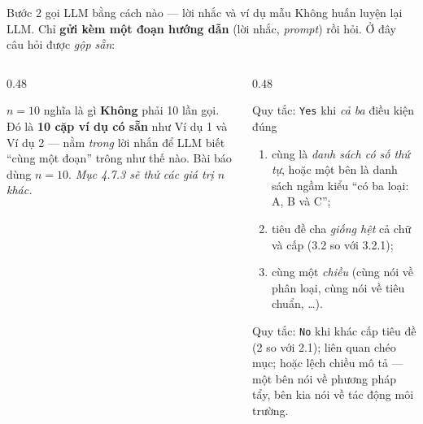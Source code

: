 \documentclass[aspectratio=169,10pt]{beamer}
\begin{document}
\begin{frame}{Bước 2 gọi LLM bằng cách nào --- lời nhắc và ví dụ mẫu}
  {\footnotesize Không huấn luyện lại LLM. Chỉ \textbf{gửi kèm một đoạn hướng dẫn}
  (lời nhắc, \emph{prompt}) rồi hỏi. Ở đây câu hỏi được \emph{gộp sẵn}:}
  \begin{center}
  \scriptsize\itshape
  \end{center}
  \begin{columns}[T]
    \begin{column}{0.48\textwidth}
      \begin{block}{\small $n = 10$ nghĩa là gì}
        \footnotesize \textbf{Không} phải 10 lần gọi. Đó là \textbf{10 cặp ví dụ có sẵn}
        như Ví dụ 1 và Ví dụ 2 --- nằm \emph{trong} lời nhắn để LLM biết ``cùng một đoạn''
        trông như thế nào. Bài báo dùng $n = 10$.
        {\footnotesize\itshape Mục 4.7.3 sẽ thử các giá trị $n$ khác.}
      \end{block}
    \end{column}
    \begin{column}{0.48\textwidth}
      \begin{alertblock}{\small Quy tắc: \texttt{Yes} khi \emph{cả ba} điều kiện đúng}
        \footnotesize
        \begin{enumerate}
          \itemsep1pt
          \item cùng là \emph{danh sách có số thứ tự}, hoặc một bên là danh sách ngầm kiểu
                ``có ba loại: A, B và C'';
          \item tiêu đề cha \emph{giống hệt} cả chữ và cấp (3.2 so với 3.2.1);
          \item cùng một \emph{chiều} (cùng nói về phân loại, cùng nói về tiêu chuẩn, \ldots).
        \end{enumerate}
      \end{alertblock}
      \begin{block}{\small Quy tắc: \texttt{No} khi}
        \footnotesize khác cấp tiêu đề (2 so với 2.1); liên quan chéo mục; hoặc lệch chiều mô
        tả --- một bên nói về phương pháp tẩy, bên kia nói về tác động môi trường.
      \end{block}
    \end{column}
  \end{columns}
\end{frame}
\end{document}
